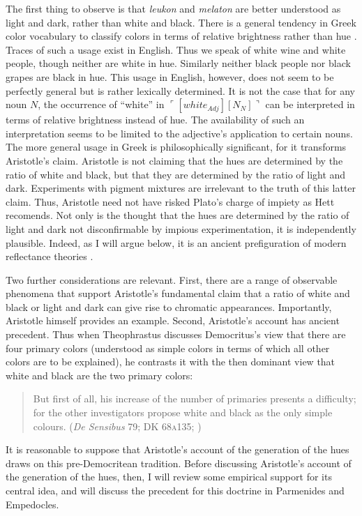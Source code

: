 The first thing to observe is that \emph{leukon} and \emph{melaton} are better understood as light and dark, rather than white and black. There is a general tendency in Greek color vocabulary to classify colors in terms of relative brightness rather than hue \citep[see][]{Gladstone:1858fk,Platnauer:1921bh,Osbourne:1968vn,Lloyd:2007fk}. Traces of such a usage exist in English. Thus we speak of white wine and white people, though neither are white in hue. Similarly neither black people nor black grapes are black in hue. This usage in English, however, does not seem to be perfectly general but is rather lexically determined. It is not the case that for any noun \( N \), the occurrence of ``white'' in \( \ulcorner [white_{Adj}][N_{N}] \urcorner \) can be interpreted in terms of relative brightness instead of hue. The availability of such an interpretation seems to be limited to the adjective's application to certain nouns. The more general usage in Greek is philosophically significant, for it transforms Aristotle's claim. Aristotle is not claiming that the hues are determined by the ratio of white and black, but that they are determined by the ratio of light and dark. Experiments with pigment mixtures are irrelevant to the truth of this latter claim. Thus, Aristotle need not have risked Plato's charge of impiety as Hett recomends. Not only is the thought that the hues are determined by the ratio of light and dark not disconfirmable by impious experimentation, it is independently plausible. Indeed, as I will argue below, it is an ancient prefiguration of modern reflectance theories \citep[see][]{Hilbert:1987jq}.

Two further considerations are relevant. First, there are a range of observable phenomena that support Aristotle's fundamental claim that a ratio of white and black or light and dark can give rise to chromatic appearances. Importantly, Aristotle himself provides an example. Second, Aristotle's account has ancient precedent. Thus when Theophrastus discusses Democritus's view that there are four primary colors (understood as simple colors in terms of which all other colors are to be explained), he contrasts it with the then dominant view that white and black are the two primary colors:
\begin{quote}
    But first of all, his increase of the number of primaries presents a difficulty; for the other investigators propose white and black as the only simple colours. (\emph{De Sensibus} 79; DK 68\textsc{a}135; \citealt{Stratton:1917vn})
\end{quote}
It is reasonable to suppose that Aristotle's account of the generation of the hues draws on this pre-Democritean tradition. Before discussing Aristotle's account of the generation of the hues, then, I will review some empirical support for its central idea, and will discuss the precedent for this doctrine in Parmenides and Empedocles.

